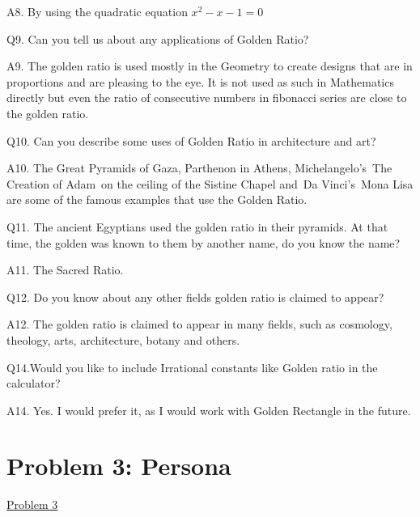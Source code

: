 \documentclass[12pt]{extarticle}
\begin{document}
   
   A8. By using the quadratic equation $x^2-x-1=0$
   \newline
   
   Q9. Can you tell us about any applications of Golden Ratio?
   
   
   A9. The golden ratio is used mostly in the Geometry to create designs that are in proportions and are
pleasing to the eye. It is not used as such in Mathematics directly but even the ratio of consecutive
numbers in fibonacci series are close to the golden ratio.
   \newline

   Q10. Can you describe some uses of Golden Ratio in architecture and art?
   
   
   A10. The Great Pyramids of Gaza, Parthenon in Athens, Michelangelo’s The Creation of Adam on the
ceiling of the Sistine Chapel and Da Vinci’s Mona Lisa are some of the famous examples that use the
Golden Ratio.
   \newline

  Q11. The ancient Egyptians used the golden ratio in their pyramids. At that time,     the golden was known to them by another name, do you know the name?
  
  
  A11. The Sacred Ratio.
  \newline

   Q12. Do you know about any other fields golden ratio is claimed to appear?
   
   
   A12. The golden ratio is claimed to appear in many fields, such as cosmology, theology, arts, architecture, botany and others.
   \newline
   
   Q14.Would you like to include Irrational constants like Golden ratio in the calculator?


A14. Yes. I would prefer it, as I would work with Golden Rectangle in the future.
\newpage
\section{Problem 3: Persona}
\hspace{4.5cm}   \underline{Problem 3}
\end{document}
